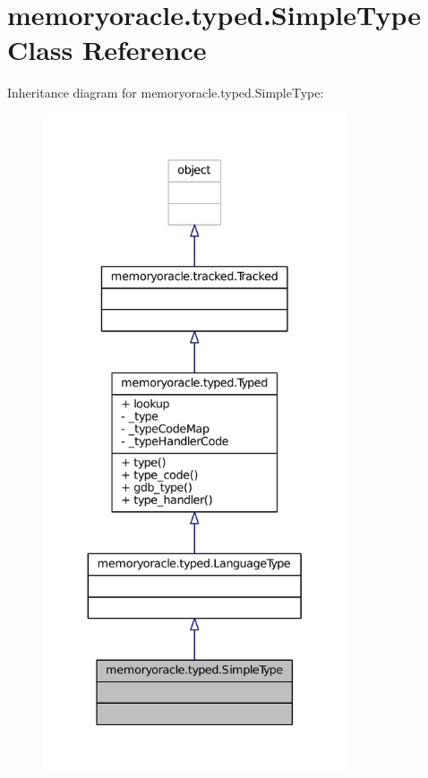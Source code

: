 \hypertarget{classmemoryoracle_1_1typed_1_1SimpleType}{}\section{memoryoracle.\+typed.\+Simple\+Type Class Reference}
\label{classmemoryoracle_1_1typed_1_1SimpleType}


Inheritance diagram for memoryoracle.\+typed.\+Simple\+Type\+:\nopagebreak
\begin{figure}[H]
\begin{center}
\leavevmode
\includegraphics[height=550pt]{classmemoryoracle_1_1typed_1_1SimpleType__inherit__graph}
\end{center}
\end{figure}


